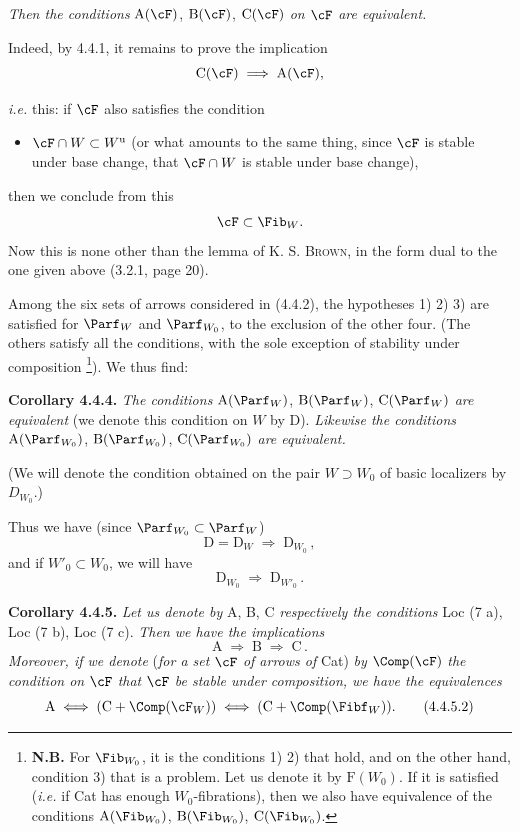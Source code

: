 \noindent\textit{Then the conditions} $\mathrm{A}(\cF)$, $\mathrm{B}(\cF)$, $\mathrm{C}(\cF)$ \textit{on $\cF$ are equivalent.}

Indeed, by 4.4.1, it remains to prove the implication
\[
\mathrm{C}(\cF) \;\Longrightarrow\; \mathrm{A}(\cF),
\]


\textit{i.e.} this: if $\cF$ also satisfies the condition
\begin{itemize}[leftmargin=3em]
\item[4)] $\cF \cap W \subset W^{\mathrm{u}}$ (or what amounts to the same thing, since $\cF$ is stable under base change, that $\cF \cap W$ is stable under base change),
\end{itemize}
then we conclude from this
\[
\cF \subset \Fib_W.
\]
Now this is none other than the lemma of K. S. \textsc{Brown}, in the form dual to the one given above (3.2.1, page 20).

Among the six sets of arrows considered in (4.4.2), the hypotheses 1) 2) 3) are satisfied for $\Parf_W$ and $\Parf_{W_0}$, to the exclusion of the other four. (The others satisfy all the conditions, with the sole exception of stability under composition \footnote[30]{\textbf{N.B.} For $\Fib_{W_0}$, it is the conditions 1) 2) that hold, and on the other hand, condition 3) that is a problem. Let us denote it by $\mathrm{F}(W_0)$. If it is satisfied (\textit{i.e.} if Cat has enough $W_0$-fibrations), then we also have equivalence of the conditions $\mathrm{A}(\Fib_{W_0})$, $\mathrm{B}(\Fib_{W_0})$, $\mathrm{C}(\Fib_{W_0})$.}). We thus find:

\textbf{Corollary 4.4.4.} \textit{The conditions} $\mathrm{A}(\Parf_W)$, $\mathrm{B}(\Parf_W)$, $\mathrm{C}(\Parf_W)$ \textit{are equivalent} (we denote this condition on $W$ by D). \textit{Likewise the conditions} $\mathrm{A}(\Parf_{W_0})$, $\mathrm{B}(\Parf_{W_0})$, $\mathrm{C}(\Parf_{W_0})$ \textit{are equivalent.}


(We will denote the condition obtained on the pair $W \supset W_0$ of basic localizers by $D_{W_0}$.)

Thus we have (since $\Parf_{W_0} \subset \Parf_W$)
\[
\mathrm{D} = \mathrm{D}_W \;\Longrightarrow\; \mathrm{D}_{W_0}\,,
\tag*{(4.4.4)}
\]
and if $W'_0 \subset W_0$, we will have
\[
\mathrm{D}_{W_0} \;\Longrightarrow\; \mathrm{D}_{W'_0}\,.
\tag*{(4.4.5)}
\]

\textbf{Corollary 4.4.5.} \textit{Let us denote by} A, B, C \textit{respectively the conditions} Loc (7 a), Loc (7 b), Loc (7 c). \textit{Then we have the implications}
\[
\mathrm{A} \;\Longrightarrow\; \mathrm{B} \;\Longrightarrow\; \mathrm{C}\,.
\tag*{(4.4.5.1)}
\]
\textit{Moreover, if we denote} (\textit{for a set $\cF$ of arrows of} Cat) \textit{by} $\Comp(\cF)$ \textit{the condition on $\cF$ that $\cF$ be stable under composition, we have the equivalences}
\[
\mathrm{A} \iff (\mathrm{C} + \Comp(\cF_W)) \iff (\mathrm{C} + \Comp(\Fibf_W)).
\tag*{(4.4.5.2)}
\]

